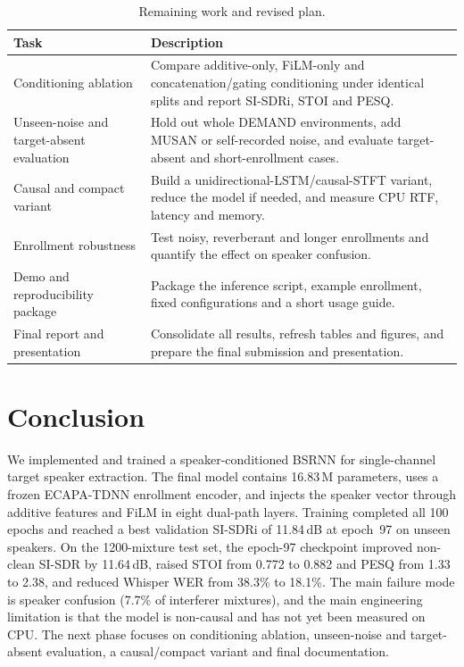 \documentclass[11pt,a4paper]{article}
\newcommand{\sisdr}{SI-SDR}
\newcommand{\sisdri}{SI-SDRi}
\begin{document}
\begin{table}[H]
\centering\small
\caption{Remaining work and revised plan.}
\label{tab:plan}
\begin{tabularx}{\textwidth}{@{}>{\raggedright\arraybackslash}p{4.3cm} Y@{}}
\toprule
\textbf{Task} & \textbf{Description}\\
\midrule
Conditioning ablation & Compare additive-only, FiLM-only and concatenation/gating conditioning
  under identical splits and report \sisdri, STOI and PESQ.\\
Unseen-noise and target-absent evaluation & Hold out whole DEMAND environments, add MUSAN or
  self-recorded noise, and evaluate target-absent and short-enrollment cases.\\
Causal and compact variant & Build a unidirectional-LSTM/causal-STFT variant, reduce the model if
  needed, and measure CPU RTF, latency and memory.\\
Enrollment robustness & Test noisy, reverberant and longer enrollments and quantify the effect on
  speaker confusion.\\
Demo and reproducibility package & Package the inference script, example enrollment, fixed
  configurations and a short usage guide.\\
Final report and presentation & Consolidate all results, refresh tables and figures, and prepare
  the final submission and presentation.\\
\bottomrule
\end{tabularx}
\end{table}

\section{Conclusion}
\label{sec:conclusion}
We implemented and trained a speaker-conditioned BSRNN for single-channel target speaker
extraction. The final model contains 16.83\,M parameters, uses a frozen ECAPA-TDNN enrollment
encoder, and injects the speaker vector through additive features and FiLM in eight dual-path
layers. Training completed all 100 epochs and reached a best validation \sisdri{} of 11.84\,dB at
epoch~97 on unseen speakers. On the 1200-mixture test set, the epoch-97 checkpoint improved
non-clean \sisdr{} by 11.64\,dB, raised STOI from 0.772 to 0.882 and PESQ from 1.33 to 2.38, and
reduced Whisper WER from 38.3\% to 18.1\%. The main failure mode is speaker confusion (7.7\% of
interferer mixtures), and the main engineering limitation is that the model is non-causal and has
not yet been measured on CPU. The next phase focuses on conditioning ablation, unseen-noise and
target-absent evaluation, a causal/compact variant and final documentation.
\end{document}
